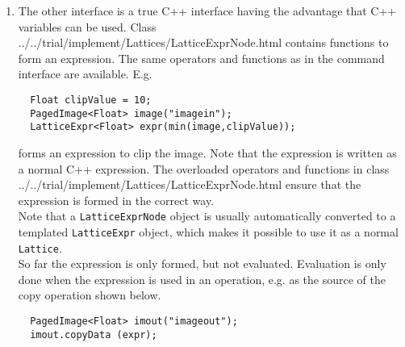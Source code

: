 \begin{itemize}
\begin{enumerate}
  \item
    The other interface is a true C++ interface having the
    advantage that C++ variables can be used. Class
    {../../trial/implement/Lattices/LatticeExprNode.html}
    contains functions to form an expression. The same operators
    and functions as in the command interface are available.
    E.g.
\begin{verbatim}
  Float clipValue = 10;
  PagedImage<Float> image("imagein");
  LatticeExpr<Float> expr(min(image,clipValue));
\end{verbatim}
    forms an expression to clip the image. Note that the expression is
    written as a normal C++ expression. The overloaded operators and
    functions in class 
    {../../trial/implement/Lattices/LatticeExprNode.html}
    ensure that the expression is formed in the correct way.
    \\Note that a \texttt{LatticeExprNode} object is usually
    automatically converted to a templated \texttt{LatticeExpr} object,
    which makes it possible to use it as a normal \texttt{Lattice}.
    \\So far the expression is only formed, but not evaluated.
    Evaluation is only done when the expression is used in an
    operation, e.g. as the source of the copy operation shown below.
\begin{verbatim}
  PagedImage<Float> imout("imageout");
  imout.copyData (expr);
\end{verbatim}

  \end{enumerate}

\end{itemize}

